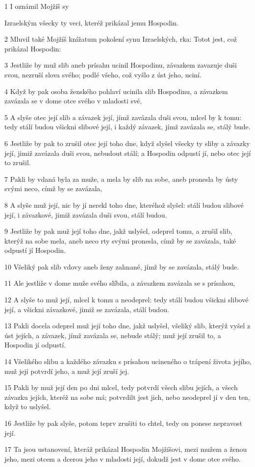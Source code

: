 \par 1 I oznámil Mojžíš sy\par Izraelským všecky ty veci, kteréž prikázal jemu Hospodin.
\par 2 Mluvil také Mojžíš knížatum pokolení synu Izraelských, rka: Totot jest, což prikázal Hospodin:
\par 3 Jestliže by muž slib aneb prísahu ucinil Hospodinu, závazkem zavazuje duši svou, nezruší slova svého; podlé všeho, což vyšlo z úst jeho, uciní.
\par 4 Když by pak osoba ženského pohlaví ucinila slib Hospodinu, a závazkem zavázala se v dome otce svého v mladosti své,
\par 5 A slyše otec její slib a závazek její, jímž zavázala duši svou, mlcel by k tomu: tedy stálí budou všickni slibové její, i každý závazek, jímž zavázala se, stálý bude.
\par 6 Jestliže by pak to zrušil otec její toho dne, když slyšel všecky ty sliby a závazky její, jimiž zavázala duši svou, nebudout stálí; a Hospodin odpustí jí, nebo otec její to zrušil.
\par 7 Pakli by vdaná byla za muže, a mela by slib na sobe, aneb pronesla by ústy svými neco, címž by se zavázala,
\par 8 A slyše muž její, nic by jí nerekl toho dne, kteréhož slyšel: stálí budou slibové její, i závazkové, jimiž zavázala duši svou, stálí budou.
\par 9 Jestliže by pak muž její toho dne, jakž uslyšel, odeprel tomu, a zrušil slib, kterýž na sobe mela, aneb neco rty svými pronesla, címž by se zavázala, také odpustí jí Hospodin.
\par 10 Všeliký pak slib vdovy aneb ženy zahnané, jímž by se zavázala, stálý bude.
\par 11 Ale jestliže v dome muže svého slíbila, a závazkem zavázala se s prísahou,
\par 12 A slyše to muž její, mlcel k tomu a neodeprel: tedy stálí budou všickni slibové její, a všickni závazkové, jimiž se zavázala, stálí budou.
\par 13 Pakli docela odeprel muž její toho dne, jakž uslyšel, všeliký slib, kterýž vyšel z úst jejích, a závazek, jímž zavázala se, nebude stálý; muž její zrušil to, a Hospodin jí odpustí.
\par 14 Všelikého slibu a každého závazku s prísahou ucineného o trápení života jejího, muž její potvrdí jeho, a muž její zruší jej.
\par 15 Pakli by muž její den po dni mlcel, tedy potvrdí všech slibu jejích, a všech závazku jejích, kteréž na sobe má; potvrdilt jest jich, nebo neodeprel jí v den ten, když to uslyšel.
\par 16 Jestliže by pak slyše, potom teprv zrušiti to chtel, tedy on ponese nepravost její.
\par 17 Ta jsou ustanovení, kteráž prikázal Hospodin Mojžíšovi, mezi mužem a ženou jeho, mezi otcem a dcerou jeho v mladosti její, dokudž jest v dome otce svého.

